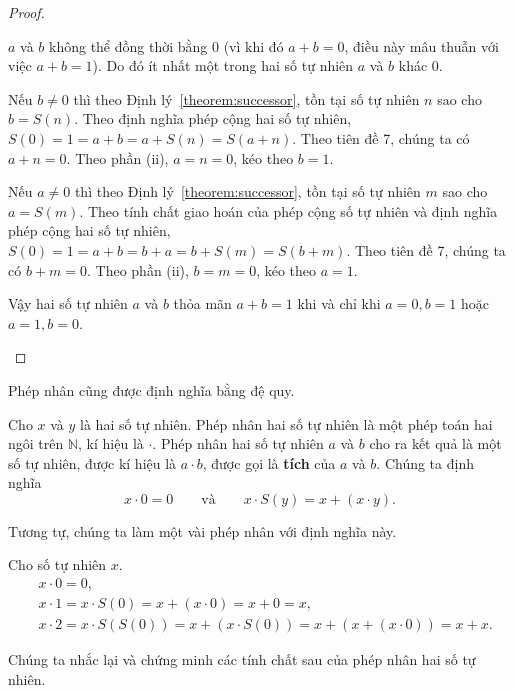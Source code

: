 \begin{proof}
\begin{enumerate}[label={(\roman*)}]
		      $a$ và $b$ không thể đồng thời bằng $0$ (vì khi đó $a + b = 0$, điều này mâu thuẫn với việc $a + b = 1$). Do đó ít nhất một trong hai số tự nhiên $a$ và $b$ khác $0$.

		      Nếu $b\ne 0$ thì theo Định lý~\ref{theorem:successor}, tồn tại số tự nhiên $n$ sao cho $b = S(n)$. Theo định nghĩa phép cộng hai số tự nhiên, $S(0) = 1 = a + b = a + S(n) = S(a + n)$. Theo tiên đề 7, chúng ta có $a + n = 0$. Theo phần (ii), $a = n = 0$, kéo theo $b = 1$.

		      Nếu $a\ne 0$ thì theo Định lý~\ref{theorem:successor}, tồn tại số tự nhiên $m$ sao cho $a = S(m)$. Theo tính chất giao hoán của phép cộng số tự nhiên và định nghĩa phép cộng hai số tự nhiên, $S(0) = 1 = a + b = b + a = b + S(m) = S(b + m)$. Theo tiên đề 7, chúng ta có $b + m = 0$. Theo phần (ii), $b = m = 0$, kéo theo $a = 1$.

		      Vậy hai số tự nhiên $a$ và $b$ thỏa mãn $a + b = 1$ khi và chỉ khi $a = 0, b = 1$ hoặc $a = 1, b = 0$.
	\end{enumerate}
\end{proof}

Phép nhân cũng được định nghĩa bằng đệ quy.
\begin{definition}
	Cho $x$ và $y$ là hai số tự nhiên. Phép nhân hai số tự nhiên là một phép toán hai ngôi trên $\mathbb{N}$, kí hiệu là $\cdot$. Phép nhân hai số tự nhiên $a$ và $b$ cho ra kết quả là một số tự nhiên, được kí hiệu là $a\cdot b$, được gọi là \textbf{tích} của $a$ và $b$. Chúng ta định nghĩa
	\[
		x\cdot 0 = 0\qquad\text{và}\qquad x\cdot S(y) = x + (x\cdot y).
	\]
\end{definition}

Tương tự, chúng ta làm một vài phép nhân với định nghĩa này.

\begin{example}
	Cho số tự nhiên $x$.
	\begin{align*}
		 & x \cdot 0 = 0,                                                                 \\
		 & x \cdot 1 = x\cdot S(0) = x + (x\cdot 0) = x + 0 = x,                          \\
		 & x \cdot 2 = x\cdot S(S(0)) = x + (x\cdot S(0)) = x + (x + (x\cdot 0)) = x + x.
	\end{align*}
\end{example}

Chúng ta nhắc lại và chứng minh các tính chất sau của phép nhân hai số tự nhiên.

